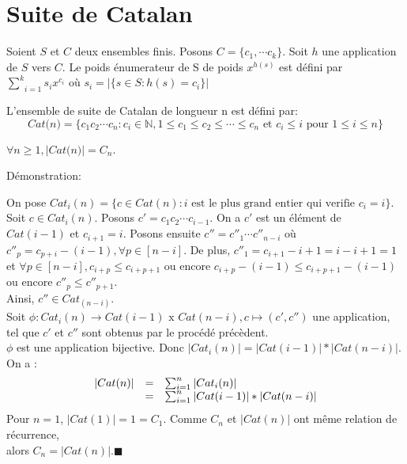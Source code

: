	\section{Suite de Catalan}
		\begin{definition}
			\begin{rm}
				Soient $S$ et $C$ deux  ensembles finis. Posons $C=\{c_{1},\cdots c_{k}\}$. Soit $h$ une application de  $S$ vers $C$. Le poids énumerateur de S de poids $x^{h(s)}$ est défini par $\underset{i=1}{\overset{k}{\sum}}s_{i}x^{c_{i}}$ où $s_{i}=|\{s\in S:h(s)=c_{i}\}|$
			\end{rm}
		\end{definition}

		\begin{definition}
			\begin{rm}
				L'ensemble de suite de Catalan de longueur n est défini par: \[\textit{Cat(n)}=\{c_{1}c_{2} \cdots c_{n}:c_{i} \in \mathbb{N},1 \leq c_{1} \leq c_{2} \leq \cdots \leq c_{n} \text{ et } c_{i} \leq i \text{ pour } 1 \leq i \leq n \}\]
			\end{rm}
		\end{definition}

		\begin{proposition}
		$\forall n \geq 1, |\textit{Cat(n)}| = C_{n}$.
		\end{proposition}

		\textmd{Démonstration:}

			On pose $Cat_{i}(n)=\{c \in Cat(n):i \text{ est le plus grand entier qui verifie } c_{i}=i\}$. Soit $c\in Cat_{i}(n)$. Posons $c'=c_{1}c_{2} \cdots c_{i-1}$. On a $c'$ est un élément de $Cat(i-1)$ et  $c_{i+1}=i$. Posons ensuite $c''=c''_{1}\cdots c''_{n-i}$ où $c''_{p}=c_{p+i}-(i-1), \forall p\in [n-i]$. De plus, $c''_{1} = c_{i+1}-i+1=i-i+1=1$ et $\forall p \in [n-i], c_{i+p}\leq c_{i+p+1} $ ou encore $c_{i+p}-(i-1)\leq c_{i+p+1}-(i-1)$ ou encore $c''_{p}\leq c''_{p+1}$.\\ Ainsi, $c''\in Cat_(n-i)$.\\
			Soit $\phi:  Cat_{i}(n)  \longrightarrow  Cat(i-1)\text{ x }Cat(n-i),c \longmapsto (c' ,  c'')$
			une application, tel que $c'$ et  $c''$ sont obtenus par le procédé précèdent.\\ $\phi$ est une application bijective. Donc $|Cat_{i}(n)|=|Cat(i-1)|*|Cat(n-i)|$.\\
			On a : 
			$$
			\begin{array}{c c l}
				|Cat(n)|&=&\sum_{i=1}^{n}|Cat_{i}(n)|\\
				&=&\sum_{i=1}^{n}|Cat(i-1)|*|Cat(n-i)|
			\end{array}
			$$
			Pour $n=1$, $|Cat(1)|=1=C_{1}$.
			Comme $C_{n}$ et $|Cat(n)|$ ont même relation de récurrence,\\ alors $C_{n}=|Cat(n)|. \blacksquare$

